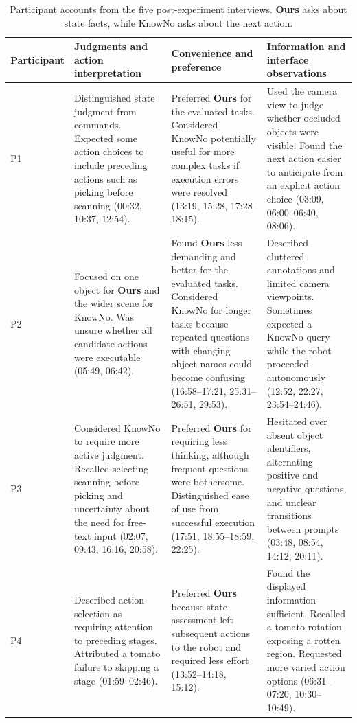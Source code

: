 \begin{table}[!htbp]
\centering
\caption{Participant accounts from the five post-experiment interviews. \textbf{Ours} asks about state facts, while KnowNo asks about the next action.}
\label{tab:app_interview_summary}
\small
\setlength{\tabcolsep}{5pt}
\renewcommand{\arraystretch}{1.15}
\begin{tabularx}{\textwidth}{@{}l>{\raggedright\arraybackslash}X>{\raggedright\arraybackslash}X>{\raggedright\arraybackslash}X@{}}
\toprule
Participant & Judgments and action interpretation & Convenience and preference & Information and interface observations \\
\midrule
P1 & Distinguished state judgment from commands. Expected some action choices to include preceding actions such as picking before scanning (00:32, 10:37, 12:54). & Preferred \textbf{Ours} for the evaluated tasks. Considered KnowNo potentially useful for more complex tasks if execution errors were resolved (13:19, 15:28, 17:28--18:15). & Used the camera view to judge whether occluded objects were visible. Found the next action easier to anticipate from an explicit action choice (03:09, 06:00--06:40, 08:06). \\
\addlinespace
P2 & Focused on one object for \textbf{Ours} and the wider scene for KnowNo. Was unsure whether all candidate actions were executable (05:49, 06:42). & Found \textbf{Ours} less demanding and better for the evaluated tasks. Considered KnowNo for longer tasks because repeated questions with changing object names could become confusing (16:58--17:21, 25:31--26:51, 29:53). & Described cluttered annotations and limited camera viewpoints. Sometimes expected a KnowNo query while the robot proceeded autonomously (12:52, 22:27, 23:54--24:46). \\
\addlinespace
P3 & Considered KnowNo to require more active judgment. Recalled selecting scanning before picking and uncertainty about the need for free-text input (02:07, 09:43, 16:16, 20:58). & Preferred \textbf{Ours} for requiring less thinking, although frequent questions were bothersome. Distinguished ease of use from successful execution (17:51, 18:55--18:59, 22:25). & Hesitated over absent object identifiers, alternating positive and negative questions, and unclear transitions between prompts (03:48, 08:54, 14:12, 20:11). \\
\addlinespace
P4 & Described action selection as requiring attention to preceding stages. Attributed a tomato failure to skipping a stage (01:59--02:46). & Preferred \textbf{Ours} because state assessment left subsequent actions to the robot and required less effort (13:52--14:18, 15:12). & Found the displayed information sufficient. Recalled a tomato rotation exposing a rotten region. Requested more varied action options (06:31--07:20, 10:30--10:49). \\

\end{tabularx}
\end{table}
